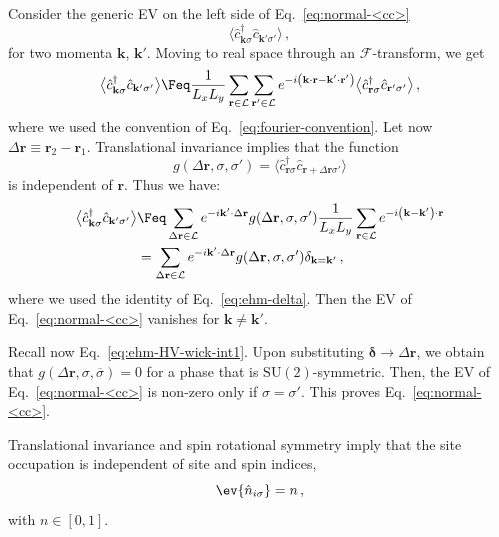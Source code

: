 \begin{tabproof}
	
	Consider the generic EV on the left side of Eq.~\eqref{eq:normal-<cc>}
	\[
		\big\langle \hat c_{\mathbf{k}\sigma}^\dagger \hat c_{\mathbf{k}'\sigma'} \big\rangle \, ,
	\]
	for two momenta $\mathbf{k}$, $\mathbf{k}'$. Moving to real space through an $\mathcal{F}$-transform, we get
	\[
		\big\langle \hat c_{\mathbf{k}\sigma}^\dagger \hat c_{\mathbf{k}'\sigma'} \big\rangle \Feq \frac{1}{L_x L_y} \sum_{\mathbf{r} \in \mathcal{L}} \sum_{\mathbf{r}' \in \mathcal{L}} e^{-i \left(\mathbf{k} \cdot \mathbf{r} - \mathbf{k}' \cdot \mathbf{r}' \right)} \big\langle \hat c_{\mathbf{r}\sigma}^\dagger \hat c_{\mathbf{r}'\sigma'} \big\rangle \, ,
	\]
	where we used the convention of Eq.~\eqref{eq:fourier-convention}. Let now $\Delta \mathbf{r} \equiv \mathbf{r}_2 - \mathbf{r}_1$. Translational invariance implies that the function
	\[
		g(\Delta \mathbf{r}, \sigma, \sigma') = \big\langle \hat c_{\mathbf{r}\sigma}^\dagger \hat c_{\mathbf{r}+\Delta\mathbf{r}\sigma'} \big\rangle
	\]
	is independent of $\mathbf{r}$. Thus we have:
	\[
	\begin{aligned}
		\big\langle \hat c_{\mathbf{k}\sigma}^\dagger \hat c_{\mathbf{k}'\sigma'} \big\rangle &\Feq \sum_{\Delta\mathbf{r} \in \mathcal{L}} e^{-i \mathbf{k}' \cdot \Delta\mathbf{r}} g(\Delta \mathbf{r}, \sigma, \sigma') \frac{1}{L_x L_y} \sum_{\mathbf{r} \in \mathcal{L}} e^{-i \left(\mathbf{k} - \mathbf{k}'\right) \cdot \mathbf{r}} \\
		&= \sum_{\Delta\mathbf{r} \in \mathcal{L}} e^{-i \mathbf{k}' \cdot \Delta\mathbf{r}} g(\Delta \mathbf{r}, \sigma, \sigma') \delta_{\mathbf{k}=\mathbf{k}'} \, ,
	\end{aligned}
	\]
	where we used the identity of Eq.~\eqref{eq:ehm-delta}. Then the EV of Eq.~\eqref{eq:normal-<cc>} vanishes for $\mathbf{k}\neq\mathbf{k}'$. 
	
	Recall now Eq.~\eqref{eq:ehm-HV-wick-int1}. Upon substituting $\bm{\delta} \to \Delta \mathbf{r}$, we obtain that $g(\Delta \mathbf{r},\sigma,\overline{\sigma})=0$ for a phase that is $\mathrm{SU}(2)$-symmetric. Then, the EV of Eq.~\eqref{eq:normal-<cc>} is non-zero only if $\sigma=\sigma'$. This proves Eq.~\eqref{eq:normal-<cc>}.
\end{tabproof}

Translational invariance and spin rotational symmetry imply that the site occupation is independent of site and spin indices,
\begin{equation}\label{eq:normal-<n_i>}
	\ev{\hat n_{i\sigma}} = n \, ,
\end{equation}
with $n \in [0,1]$.

